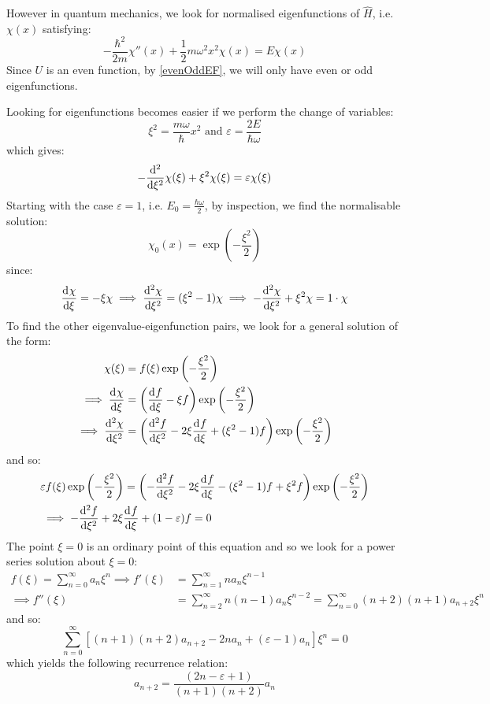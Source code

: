 \documentclass[../main.tex]{subfiles}
\begin{document}
However in quantum mechanics, we look for normalised eigenfunctions of $\hat{H}$, i.e. $\chi(x)$ satisfying:
\[
  -\frac{\hbar^2}{2m} \chi''(x) + \frac{1}{2} m \omega^2 x^2 \chi(x) = E \chi(x)
\]
Since $U$ is an even function, by \cref{evenOddEF}, we will only have even or odd eigenfunctions.

Looking for eigenfunctions becomes easier if we perform the change of variables:
\[
  \xi^2 = \frac{m\omega}{\hbar} x^2 \text{ and } \varepsilon = \frac{2E}{\hbar \omega}
\]
which gives:
\[
  -\deriv[2]{}{\xi} \chi(\xi) + \xi^2 \chi(\xi) = \varepsilon \chi(\xi)
\]
Starting with the case $\varepsilon = 1$, i.e. $E_0 = \frac{\hbar \omega}{2}$, by inspection, we find the normalisable solution:
\[
  \chi_0(x) = \exp\left(-\frac{\xi^2}{2}\right)
\]
since:
\[
  \deriv{\chi}{\xi} = - \xi \chi \implies \deriv[2]{\chi}{\xi} = (\xi^2 - 1)\chi \implies -\deriv[2]{\chi}{\xi} + \xi^2 \chi = 1 \cdot \chi
\]
To find the other eigenvalue-eigenfunction pairs, we look for a general solution of the form:
\begin{align*}
  \chi(\xi) &= f(\xi) \exp\left(-\frac{\xi^2}{2}\right) \\
  \implies \deriv{\chi}{\xi} &= \left(\deriv{f}{\xi} - \xi f\right)\exp\left(-\frac{\xi^2}{2}\right) \\
  \implies \deriv[2]{\chi}{\xi} &= \left(\deriv[2]{f}{\xi} - 2 \xi \deriv{f}{\xi} + (\xi^2 - 1)f\right) \exp\left(-\frac{\xi^2}{2}\right)
\end{align*}
and so:
\begin{align*}
  &\varepsilon f(\xi) \exp\left(-\frac{\xi^2}{2}\right) = \left(-\deriv[2]{f}{\xi} - 2 \xi \deriv{f}{\xi} - (\xi^2 - 1)f + \xi^2 f\right)\exp\left(-\frac{\xi^2}{2}\right) \\
  &\implies - \deriv[2]{f}{\xi} + 2 \xi \deriv{f}{\xi} + (1 - \varepsilon)f = 0
\end{align*}
The point $\xi = 0$ is an ordinary point of this equation and so we look for a power series solution about $\xi = 0$:
\begin{align*}
  f(\xi) = \sum_{n = 0}^{\infty} a_n \xi^n \implies f'(\xi) &= \sum_{n = 1}^{\infty} na_n \xi^{n - 1} \\
  \implies f''(\xi) &= \sum_{n = 2}^{\infty} n(n - 1) a_n \xi^{n - 2} = \sum_{n = 0}^{\infty} (n + 2)(n + 1)a_{n + 2} \xi^{n}
\end{align*}
and so:
\[
  \sum_{n = 0}^{\infty} [(n + 1)(n + 2)a_{n + 2} - 2na_n + (\varepsilon - 1)a_n]\xi^{n} = 0
\]
which yields the following recurrence relation:
\begin{equation}
  a_{n + 2} = \frac{(2n - \varepsilon + 1)}{(n + 1)(n + 2)}a_n \label{coeffRel}
\end{equation}
\end{document}
